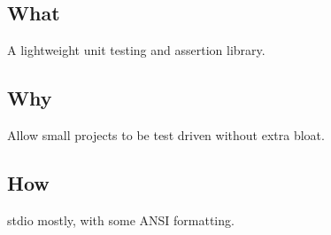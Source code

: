 \subsection*{What}


\begin{DoxyItemize}
\item A lightweight unit testing and assertion library.
\end{DoxyItemize}

\subsection*{Why}


\begin{DoxyItemize}
\item Allow small projects to be test driven without extra bloat.
\end{DoxyItemize}

\subsection*{How}


\begin{DoxyItemize}
\item stdio mostly, with some A\+N\+S\+I formatting. 
\end{DoxyItemize}